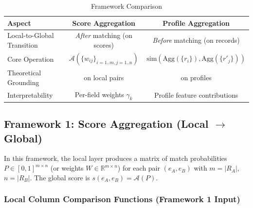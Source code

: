 \begin{table}[htbp]
	\centering
	\caption{Framework Comparison}
	\label{tab:framework_comparison}
	\begin{tabular}{lcc}
		\toprule
		\textbf{Aspect}            & \textbf{Score Aggregation}                 & \textbf{Profile Aggregation}                            \\
		\midrule
		Local-to-Global Transition & \textit{After} matching (on scores)        & \textit{Before} matching (on records)                   \\
		Core Operation             & $\mathcal{A}(\{w_{ij}\}_{i=1..m, j=1..n})$ & $\text{sim}(\text{Agg}(\{r_i\}), \text{Agg}(\{r'_j\}))$ \\
		Theoretical Grounding      & \fellegisunter{} on local pairs            & \fellegisunter{} on profiles                            \\
		Interpretability           & Per-field weights $\gamma_k$               & Profile feature contributions                           \\
		\bottomrule
	\end{tabular}
\end{table}

\subsection{Framework 1: Score Aggregation (Local $\to$ Global)}
\label{sec:score_aggregation}
\label{sec:agg_functions}

In this framework, the local layer produces a matrix of match probabilities $P \in [0,1]^{m \times n}$ (or weights $W \in \mathbb{R}^{m \times n}$) for each \globalentity{} pair $(e_A, e_B)$ with $m = |R_A|$, $n = |R_B|$. The global score is $s(e_A, e_B) = \mathcal{A}(P)$.

\subsubsection{Local Column Comparison Functions (Framework 1 Input)}
\label{sec:local_column_similarities}


